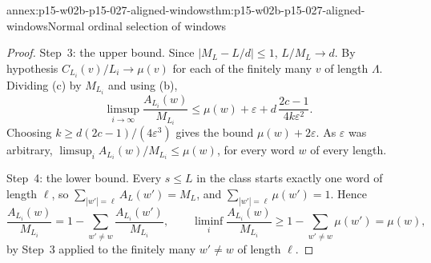 \begin{annexitem}{annex:p15-w02b-p15-027-aligned-windows}{thm:p15-w02b-p15-027-aligned-windows}{Normal ordinal selection of windows}
\begin{proof}
Step~3: the upper bound. Since \(|M_L-L/d|\leq1\), \(L/M_{L}\to d\).
By hypothesis \(C_{L_i}(v)/L_i\to\mu(v)\) for each of the finitely many
\(v\) of length \(\Lambda\). Dividing (c) by \(M_{L_i}\) and using (b),
\[
 \limsup_{i\to\infty}\frac{A_{L_i}(w)}{M_{L_i}}
 \leq\mu(w)+\varepsilon+d\,\frac{2c-1}{4k\varepsilon^2}.
\]
Choosing \(k\geq d(2c-1)/(4\varepsilon^3)\) gives the bound
\(\mu(w)+2\varepsilon\). As \(\varepsilon\) was arbitrary,
\(\limsup_iA_{L_i}(w)/M_{L_i}\leq\mu(w)\), for every word \(w\) of
every length.

Step~4: the lower bound. Every \(s\leq L\) in the class starts exactly
one word of length \(\ell\), so \(\sum_{|w'|=\ell}A_L(w')=M_L\), and
\(\sum_{|w'|=\ell}\mu(w')=1\). Hence
\[
 \frac{A_{L_i}(w)}{M_{L_i}}=1-\sum_{w'\neq w}\frac{A_{L_i}(w')}{M_{L_i}},
 \qquad
 \liminf_i\frac{A_{L_i}(w)}{M_{L_i}}\geq1-\sum_{w'\neq w}\mu(w')=\mu(w),
\]
by Step~3 applied to the finitely many \(w'\neq w\) of length \(\ell\).
\end{proof}
\end{annexitem}

